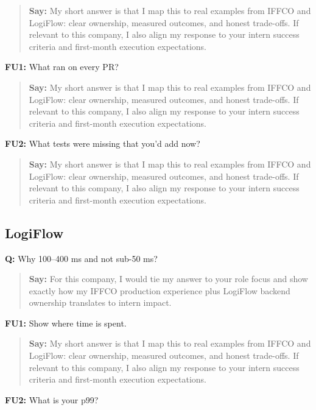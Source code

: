 \documentclass[9pt,a4paper]{article}
\begin{document}
\begin{quote}\small\textbf{Say:} My short answer is that I map this to real examples from IFFCO and LogiFlow: clear ownership, measured outcomes, and honest trade-offs. If relevant to this company, I also align my response to your intern success criteria and first-month execution expectations.\end{quote}
\vspace{2mm}
\textbf{FU1:} What ran on every PR?

\begin{quote}\small\textbf{Say:} My short answer is that I map this to real examples from IFFCO and LogiFlow: clear ownership, measured outcomes, and honest trade-offs. If relevant to this company, I also align my response to your intern success criteria and first-month execution expectations.\end{quote}
\vspace{2mm}
\textbf{FU2:} What tests were missing that you'd add now?

\begin{quote}\small\textbf{Say:} My short answer is that I map this to real examples from IFFCO and LogiFlow: clear ownership, measured outcomes, and honest trade-offs. If relevant to this company, I also align my response to your intern success criteria and first-month execution expectations.\end{quote}
\vspace{2mm}
\subsection{LogiFlow}
\textbf{Q:} Why 100--400 ms and not sub-50 ms?

\begin{quote}\small\textbf{Say:} For this company, I would tie my answer to your role focus and show exactly how my IFFCO production experience plus LogiFlow backend ownership translates to intern impact.\end{quote}
\vspace{2mm}
\textbf{FU1:} Show where time is spent.

\begin{quote}\small\textbf{Say:} My short answer is that I map this to real examples from IFFCO and LogiFlow: clear ownership, measured outcomes, and honest trade-offs. If relevant to this company, I also align my response to your intern success criteria and first-month execution expectations.\end{quote}
\vspace{2mm}
\textbf{FU2:} What is your p99?
\end{document}
